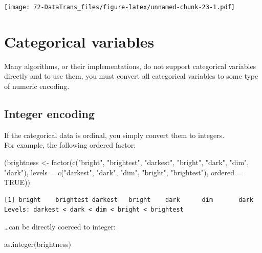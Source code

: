 \documentclass[
]{book}
\newenvironment{Shaded}{\begin{snugshade}}{\end{snugshade}}
\newcommand{\AttributeTok}[1]{\textcolor[rgb]{0.77,0.63,0.00}{#1}}
\newcommand{\ConstantTok}[1]{\textcolor[rgb]{0.00,0.00,0.00}{#1}}
\newcommand{\FunctionTok}[1]{\textcolor[rgb]{0.00,0.00,0.00}{#1}}
\newcommand{\NormalTok}[1]{#1}
\newcommand{\OtherTok}[1]{\textcolor[rgb]{0.56,0.35,0.01}{#1}}
\newcommand{\StringTok}[1]{\textcolor[rgb]{0.31,0.60,0.02}{#1}}
\begin{document}
\texttt{[image: 72-DataTrans\_files/figure-latex/unnamed-chunk-23-1.pdf]}

\hypertarget{categorical-variables}{%
\section{Categorical variables}\label{categorical-variables}}

Many algorithms, or their implementations, do not support categorical variables directly and to use them, you must convert all categorical variables to some type of numeric encoding.

\hypertarget{integer-encoding}{%
\subsection{Integer encoding}\label{integer-encoding}}

If the categorical data is ordinal, you simply convert them to integers.\\
For example, the following ordered factor:

\begin{Shaded}
\begin{Highlighting}[]
\NormalTok{(brightness }\OtherTok{\textless{}{-}} \FunctionTok{factor}\NormalTok{(}\FunctionTok{c}\NormalTok{(}\StringTok{"bright"}\NormalTok{, }\StringTok{"brightest"}\NormalTok{, }\StringTok{"darkest"}\NormalTok{,}
                    \StringTok{"bright"}\NormalTok{, }\StringTok{"dark"}\NormalTok{, }\StringTok{"dim"}\NormalTok{, }\StringTok{"dark"}\NormalTok{),}
                  \AttributeTok{levels =} \FunctionTok{c}\NormalTok{(}\StringTok{"darkest"}\NormalTok{, }\StringTok{"dark"}\NormalTok{, }\StringTok{"dim"}\NormalTok{, }\StringTok{"bright"}\NormalTok{, }\StringTok{"brightest"}\NormalTok{),}
                  \AttributeTok{ordered =} \ConstantTok{TRUE}\NormalTok{))}
\end{Highlighting}
\end{Shaded}

\begin{verbatim}
[1] bright    brightest darkest   bright    dark      dim       dark     
Levels: darkest < dark < dim < bright < brightest
\end{verbatim}

\ldots can be directly coerced to integer:

\begin{Shaded}
\begin{Highlighting}[]
\FunctionTok{as.integer}\NormalTok{(brightness)}
\end{Highlighting}
\end{Shaded}
\end{document}

